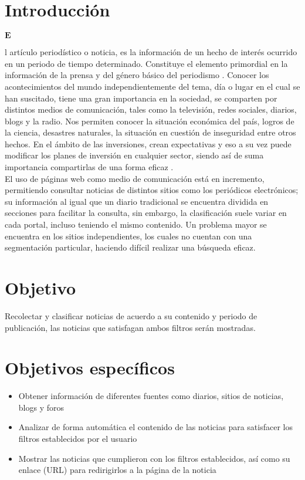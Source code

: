 \documentclass[12pt]{article}
\begin{document}


\section{Introducción}
\begin{Large}$\mathbf{E}$\end{Large}l artículo periodístico o noticia, es la información de un hecho de interés ocurrido en un periodo de tiempo determinado. Constituye el elemento primordial en la información de la prensa y del género básico del periodismo \citep{CU1}. Conocer los acontecimientos del mundo independientemente del tema, día o lugar en el cual se han suscitado, tiene una gran importancia en la sociedad, se comparten por distintos medios de comunicación, tales como la televisión, redes sociales, diarios, blogs y la radio. Nos permiten conocer la situación económica del país, logros de la ciencia, desastres naturales, la situación en cuestión de inseguridad entre otros hechos. En el ámbito de las inversiones, crean expectativas y eso a su vez puede modificar los planes de inversión en cualquier sector, siendo así de suma importancia compartirlas de una forma eficaz \citep{CU2}.\\

El uso de páginas web como medio de comunicación está en incremento, permitiendo consultar noticias de distintos sitios como los periódicos electrónicos; su información al igual que un diario tradicional se encuentra dividida en secciones para facilitar la consulta, sin embargo, la clasificación suele variar en cada portal, incluso teniendo el mismo contenido. Un problema mayor se encuentra en los sitios independientes, los cuales no cuentan con una segmentación particular, haciendo difícil realizar una búsqueda eficaz.\\

\section{Objetivo}
Recolectar y clasificar noticias de acuerdo a su contenido y periodo de publicación, las noticias que satisfagan ambos filtros serán mostradas.

\section{Objetivos específicos}
\begin{itemize}
  \item Obtener información de diferentes fuentes como diarios, sitios de noticias, blogs y foros
  \item Analizar de forma automática el contenido de las noticias para satisfacer los filtros establecidos por el usuario
  \item Mostrar las noticias que cumplieron con los filtros establecidos, así como su enlace (URL) para redirigirlos a la página de la noticia
\end{itemize}
\end{document}
